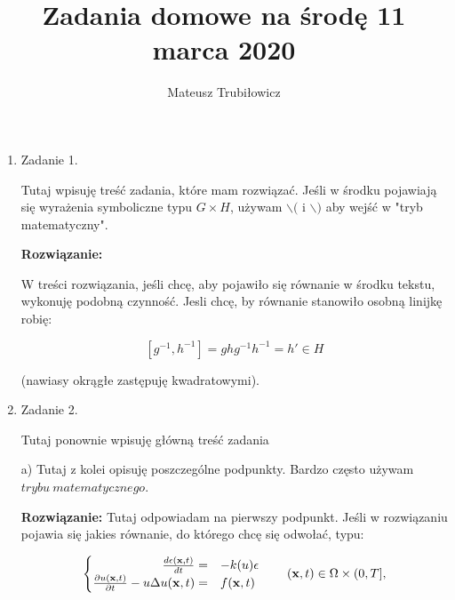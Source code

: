 \documentclass[11pt]{article}
\title{Zadania domowe na środę 11 marca 2020}
\author{Mateusz Trubiłowicz}
\begin{document}
\maketitle
\medskip

\begin{enumerate}


\item
\begin{Large}
Zadanie 1.
\end{Large}
\par
Tutaj wpisuję treść zadania, które mam rozwiązać. Jeśli w środku pojawiają się wyrażenia symboliczne typu \( G \times H\), używam  \(\backslash( \) i \(\backslash) \) %
aby wejść w "tryb matematyczny".\par

\medskip
\textbf{Rozwiązanie: }

W treści rozwiązania, jeśli chcę, aby pojawiło się równanie w środku tekstu, wykonuję podobną czynność. Jesli chcę, by równanie stanowiło osobną linijkę robię:

\[ [g^{-1},h^{-1}]=ghg^{-1}h^{-1}=h'\in H \] 

(nawiasy okrągłe zastępuję kwadratowymi).


\item
\begin{Large}
Zadanie 2.
\end{Large}
\par

Tutaj ponownie wpisuję główną treść zadania\par

a) Tutaj z kolei opisuję poszczególne podpunkty. Bardzo często używam \(trybu \ matematycznego\).\par
\medskip
\textbf{Rozwiązanie: } 
Tutaj odpowiadam na pierwszy podpunkt. Jeśli w rozwiązaniu pojawia się jakies równanie, do którego chcę się odwołać, typu:

\begin{equation}
\label{PODPIS}  %
\begin{cases}
\hfill \frac{d \epsilon(\mathbf{x},t)}{d t} =& -k(u) \epsilon \\
\hfill \frac{\partial u(\mathbf{x},t)}{\partial t} - 
u \Delta u(\mathbf{x},t) =& f(\mathbf{x},t) 
\end{cases} \quad\quad  (\mathbf{x},t) \in \Omega \times (0,T],
\end{equation}


\end{enumerate}
\end{document}

